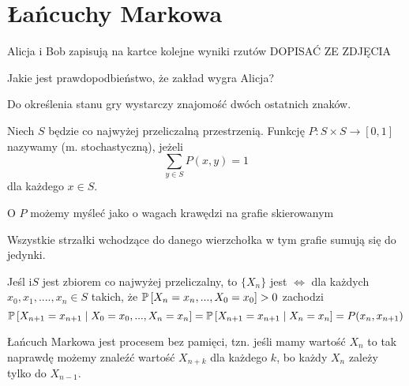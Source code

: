 \section{Łańcuchy Markowa}

\begin{example}
  \item Alicja i Bob zapisują na kartce kolejne wyniki rzutów {\large\color{red}DOPISAĆ ZE ZDJĘCIA}

    Jakie jest prawdopodbieństwo, że zakład wygra Alicja?

    Do określenia stanu gry wystarczy znajomość dwóch ostatnich znaków.
\end{example}

\begin{definition}
  Niech $S$ będzie co najwyżej przeliczalną przestrzenią. Funkcję $P:S\times S\to [0,1]$ nazywamy  (m. stochastyczną), jeżeli 
  $$\sum_{y\in S}P(x, y)=1$$
  dla każdego $x\in S$.
\end{definition}

O $P$ możemy myśleć jako o wagach krawędzi na grafie skierowanym
\begin{center}\end{center}

Wszystkie strzałki wchodzące do danego wierzchołka w tym grafie sumują się do jedynki.

\begin{definition}
  Jeśl i$S$ jest zbiorem co najwyżej przeliczalny, to $\{X_n\}$ jest  $\iff$ dla każdych $x_0,x_1,....,x_n\in S$ takich, że $\prob{X_n=x_n,...,X_0=x_0}>0$ zachodzi
  $$\prob{X_{n+1}=x_{n+1}}{X_0=x_0,...,X_n=x_n}=\prob{X_{n+1}=x_{n+1}}{X_n=x_n}=P(x_n,x_{n+1})$$
\end{definition}

Łańcuch Markowa jest procesem bez pamięci, tzn. jeśli mamy wartość $X_n$ to tak naprawdę możemy znaleźć wartość $X_{n+k}$ dla każdego $k$, bo każdy $X_n$ zależy tylko do $X_{n-1}$.
